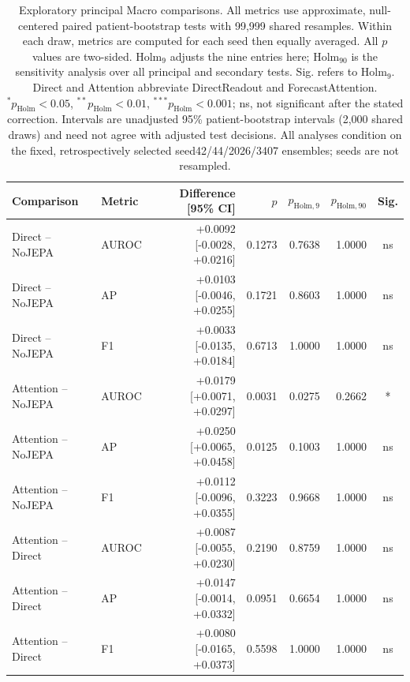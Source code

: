 \begin{table}[t]
\centering
\small
\caption{Exploratory principal Macro comparisons. All metrics use approximate, null-centered paired patient-bootstrap tests with 99,999 shared resamples. Within each draw, metrics are computed for each seed then equally averaged. All $p$ values are two-sided. Holm$_9$ adjusts the nine entries here; Holm$_{90}$ is the sensitivity analysis over all principal and secondary tests. Sig. refers to Holm$_9$. Direct and Attention abbreviate DirectReadout and ForecastAttention. $^{*}p_{\mathrm{Holm}}<0.05$, $^{**}p_{\mathrm{Holm}}<0.01$, $^{***}p_{\mathrm{Holm}}<0.001$; ns, not significant after the stated correction. Intervals are unadjusted 95\% patient-bootstrap intervals (2,000 shared draws) and need not agree with adjusted test decisions. All analyses condition on the fixed, retrospectively selected seed42/44/2026/3407 ensembles; seeds are not resampled.}
\label{tab:bootstrap}
\begin{tabular}{llrrrrc}
\toprule
Comparison & Metric & Difference [95\% CI] & $p$ & $p_{\mathrm{Holm},9}$ & $p_{\mathrm{Holm},90}$ & Sig. \\
\midrule
Direct -- NoJEPA & AUROC & +0.0092 [-0.0028, +0.0216] & 0.1273 & 0.7638 & 1.0000 & ns \\
Direct -- NoJEPA & AP & +0.0103 [-0.0046, +0.0255] & 0.1721 & 0.8603 & 1.0000 & ns \\
Direct -- NoJEPA & F1 & +0.0033 [-0.0135, +0.0184] & 0.6713 & 1.0000 & 1.0000 & ns \\
Attention -- NoJEPA & AUROC & +0.0179 [+0.0071, +0.0297] & 0.0031 & 0.0275 & 0.2662 & * \\
Attention -- NoJEPA & AP & +0.0250 [+0.0065, +0.0458] & 0.0125 & 0.1003 & 1.0000 & ns \\
Attention -- NoJEPA & F1 & +0.0112 [-0.0096, +0.0355] & 0.3223 & 0.9668 & 1.0000 & ns \\
Attention -- Direct & AUROC & +0.0087 [-0.0055, +0.0230] & 0.2190 & 0.8759 & 1.0000 & ns \\
Attention -- Direct & AP & +0.0147 [-0.0014, +0.0332] & 0.0951 & 0.6654 & 1.0000 & ns \\
Attention -- Direct & F1 & +0.0080 [-0.0165, +0.0373] & 0.5598 & 1.0000 & 1.0000 & ns \\
\bottomrule
\end{tabular}
\end{table}

